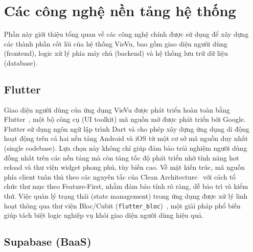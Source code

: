\section{Các công nghệ nền tảng hệ thống} %
\label{sec:core_technologies}

Phần này giới thiệu tổng quan về các công nghệ chính được sử dụng để xây dựng các thành phần cốt lõi của hệ thống VieVu, bao gồm giao diện người dùng (frontend), logic xử lý phía máy chủ (backend) và hệ thống lưu trữ dữ liệu (database).

\subsection{Flutter} %
\label{subsec:frontend_flutter}

Giao diện người dùng của ứng dụng VieVu được phát triển hoàn toàn bằng Flutter~\cite{flutter_doc}, một bộ công cụ (UI toolkit) mã nguồn mở được phát triển bởi Google. Flutter sử dụng ngôn ngữ lập trình Dart và cho phép xây dựng ứng dụng di động hoạt động trên cả hai nền tảng Android và iOS từ một cơ sở mã nguồn duy nhất (single codebase). Lựa chọn này không chỉ giúp đảm bảo trải nghiệm người dùng đồng nhất trên các nền tảng mà còn tăng tốc độ phát triển nhờ tính năng hot reload và thư viện widget phong phú, tùy biến cao. Về mặt kiến trúc, mã nguồn phía client tuân thủ theo các nguyên tắc của Clean Architecture~\cite{clean_arch} với cách tổ chức thư mục theo Feature-First, nhằm đảm bảo tính rõ ràng, dễ bảo trì và kiểm thử. Việc quản lý trạng thái (state management) trong ứng dụng được xử lý linh hoạt thông qua thư viện Bloc/Cubit (\texttt{flutter\_bloc})~\cite{bloc_package}, một giải pháp phổ biến giúp tách biệt logic nghiệp vụ khỏi giao diện người dùng hiệu quả.

\subsection{Supabase (BaaS)} %
\label{subsec:backend_supabase}

